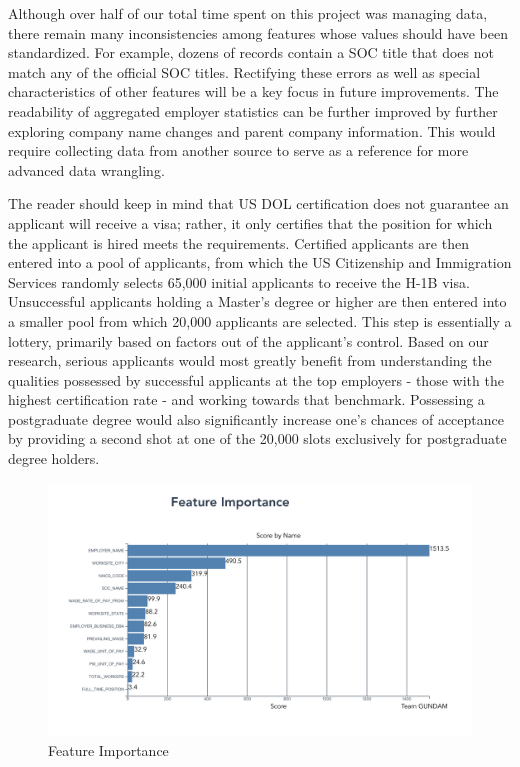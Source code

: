 \documentclass[sigconf]{acmart}
\begin{document}
Although over half of our total time spent on this project 
was managing data, there remain many inconsistencies among features whose values 
should have been standardized. For example, dozens of records contain a SOC title 
that does not match any of the official SOC titles. Rectifying these errors as well 
as special characteristics of other features will be a key focus in future improvements. 
The readability of aggregated employer statistics can be further improved by further exploring 
company name changes and parent company information. This would require collecting data from another 
source to serve as a reference for more advanced data wrangling. 

The reader should keep in mind that US DOL certification does not guarantee an 
applicant will receive a visa; 
rather, it only certifies that the 
position for which the applicant is hired meets the requirements. 
Certified applicants are then entered into a pool of 
applicants, from which the US Citizenship and Immigration Services randomly 
selects 65,000 initial applicants to receive 
the H-1B visa. Unsuccessful applicants holding a Master's degree or higher are 
then entered into a smaller pool from which 
20,000 applicants are selected. This step is essentially a lottery, 
primarily based on factors out of 
the applicant's control. Based on our research, serious applicants would most 
greatly benefit from understanding the 
qualities possessed by successful applicants at the top employers - those with 
the highest certification rate - and 
working towards that benchmark. Possessing a postgraduate degree would also 
significantly increase one's chances of 
acceptance by providing a second shot at one of the 20,000 slots exclusively 
for postgraduate degree holders. 


\begin{figure}
  \includegraphics[width=\linewidth]{feature_imortance.png}
  \caption{Feature Importance}
  \label{fig:featureimportance}
\end{figure}
\end{document}
